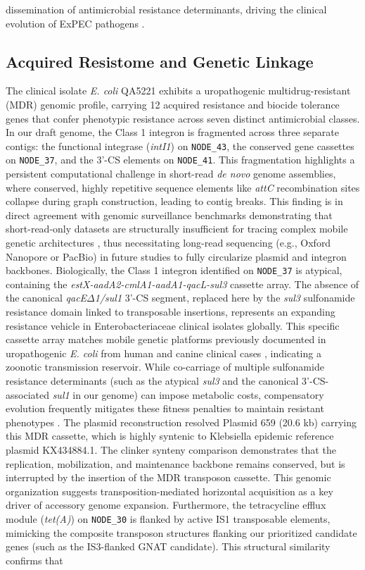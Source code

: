 \documentclass[pdflatex,sn-mathphys-num]{sn-jnl}
\begin{document}
dissemination of antimicrobial resistance determinants, driving the clinical evolution of ExPEC pathogens \cite{robertson2020mob,fuga2024hybrid}. 

\subsection{Acquired Resistome and Genetic Linkage}
The clinical isolate \textit{E. coli} QA5221 exhibits a uropathogenic multidrug-resistant (MDR) genomic profile, carrying 12 acquired resistance and biocide tolerance genes that confer phenotypic resistance across seven distinct antimicrobial classes. In our draft genome, the Class 1 integron is fragmented across three separate contigs: the functional integrase (\textit{intI1}) on \texttt{NODE\_43}, the conserved gene cassettes on \texttt{NODE\_37}, and the 3'-CS elements on \texttt{NODE\_41}. This fragmentation highlights a persistent computational challenge in short-read \textit{de novo} genome assemblies, where conserved, highly repetitive sequence elements like \textit{attC} recombination sites collapse during graph construction, leading to contig breaks. This finding is in direct agreement with genomic surveillance benchmarks demonstrating that short-read-only datasets are structurally insufficient for tracing complex mobile genetic architectures \cite{fuga2024hybrid,wick2021benchmarking}, thus necessitating long-read sequencing (e.g., Oxford Nanopore or PacBio) in future studies to fully circularize plasmid and integron backbones. Biologically, the Class 1 integron identified on \texttt{NODE\_37} is atypical, containing the \textit{estX-aadA2-cmlA1-aadA1-qacL-sul3} cassette array. The absence of the canonical \textit{qacE$\Delta$1/sul1} 3'-CS segment, replaced here by the \textit{sul3} sulfonamide resistance domain linked to transposable insertions, represents an expanding resistance vehicle in Enterobacteriaceae clinical isolates globally. This specific cassette array matches mobile genetic platforms previously documented in uropathogenic \textit{E. coli} from human and canine clinical cases \cite{menezes2022sharing}, indicating a zoonotic transmission reservoir. While co-carriage of multiple sulfonamide resistance determinants (such as the atypical \textit{sul3} and the canonical 3'-CS-associated \textit{sul1} in our genome) can impose metabolic costs, compensatory evolution frequently mitigates these fitness penalties to maintain resistant phenotypes \cite{zhou2021fitness}. The plasmid reconstruction resolved Plasmid 659 (20.6 kb) carrying this MDR cassette, which is highly syntenic to Klebsiella epidemic reference plasmid KX434884.1. The clinker synteny comparison demonstrates that the replication, mobilization, and maintenance backbone remains conserved, but is interrupted by the insertion of the MDR transposon cassette. This genomic organization suggests transposition-mediated horizontal acquisition as a key driver of accessory genome expansion. Furthermore, the tetracycline efflux module (\textit{tet(A)}) on \texttt{NODE\_30} is flanked by active IS1 transposable elements, mimicking the composite transposon structures flanking our prioritized candidate genes (such as the IS3-flanked GNAT candidate). This structural similarity confirms that 
\end{document}
